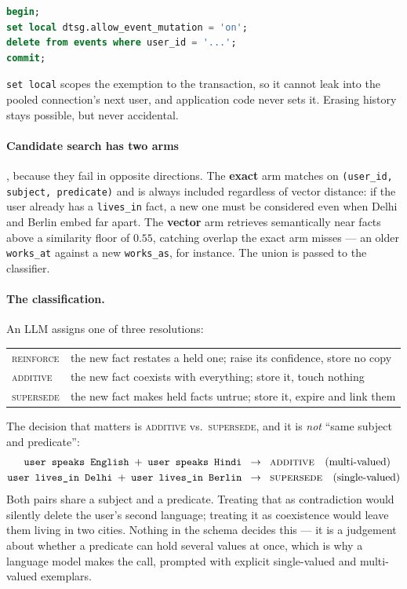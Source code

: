 \documentclass[11pt,a4paper]{article}
\begin{document}
\begin{lstlisting}[language=SQL]
begin;
set local dtsg.allow_event_mutation = 'on';
delete from events where user_id = '...';
commit;
\end{lstlisting}

\noindent \texttt{set local} scopes the exemption to the transaction, so it
cannot leak into the pooled connection's next user, and application code never
sets it. Erasing history stays possible, but never accidental.

\paragraph{Candidate search has two arms}, because they fail in opposite
directions. The \textbf{exact} arm matches on \texttt{(user\_id, subject,
predicate)} and is always included regardless of vector distance: if the user
already has a \texttt{lives\_in} fact, a new one must be considered even when
Delhi and Berlin embed far apart. The \textbf{vector} arm retrieves
semantically near facts above a similarity floor of $0.55$, catching overlap the
exact arm misses --- an older \texttt{works\_at} against a new
\texttt{works\_as}, for instance. The union is passed to the classifier.

\paragraph{The classification.} An LLM assigns one of three resolutions:

\begin{center}
\begin{tabular}{ll}
\textsc{reinforce} & the new fact restates a held one; raise its confidence, store no copy\\
\textsc{additive}  & the new fact coexists with everything; store it, touch nothing\\
\textsc{supersede} & the new fact makes held facts untrue; store it, expire and link them\\
\end{tabular}
\end{center}

\noindent The decision that matters is \textsc{additive} vs.\ \textsc{supersede},
and it is \emph{not} ``same subject and predicate'':
\begin{align*}
\texttt{user speaks English} \;+\; \texttt{user speaks Hindi}\;\;   &\rightarrow\;\; \textsc{additive} \quad\text{(multi-valued)}\\
\texttt{user lives\_in Delhi} \;+\; \texttt{user lives\_in Berlin}\;\; &\rightarrow\;\; \textsc{supersede} \quad\text{(single-valued)}
\end{align*}
Both pairs share a subject and a predicate. Treating that as contradiction
would silently delete the user's second language; treating it as coexistence
would leave them living in two cities. Nothing in the schema decides this --- it
is a judgement about whether a predicate can hold several values at once, which
is why a language model makes the call, prompted with explicit single-valued and
multi-valued exemplars.
\end{document}
